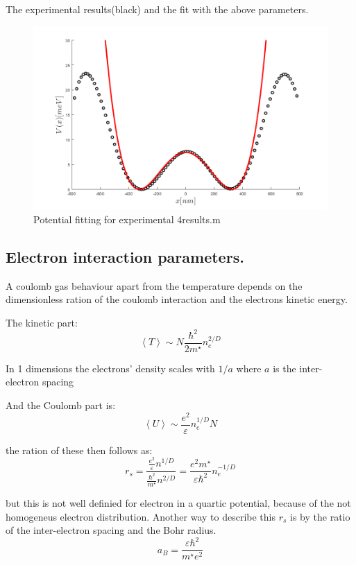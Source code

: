 \documentclass[12pt,a4paper]{article}
\numberwithin{equation}{section}
\begin{document}
The experimental results(black) and the fit with the above parameters.
\begin{figure}[!h]
\centering
\includegraphics[width=1\textwidth]{final}
\caption{Potential fitting for experimental 4results.m}
\end{figure}



\subsection{Electron interaction parameters.}

A coulomb gas behaviour apart from the temperature depends on the dimensionless ration of the coulomb interaction and the electrons kinetic energy. 

The kinetic part:
\begin{equation}
\left\langle T  \right\rangle \sim N \frac{\hbar^2}{2m^\star} n_e^{2/D}
\end{equation}

In 1 dimensions the electrons' density scales with $1/a$ where $a$ is the inter-electron spacing


And the Coulomb part is:
\begin{equation}
\left\langle U  \right\rangle \sim \frac{e^2}{\varepsilon} n_e^{1/D} N
\end{equation}

the ration of these then follows as:
\begin{equation}
r_s = \frac{\frac{e^2}{\varepsilon}n^{1/D}}{\frac{\hbar^2}{m^\star}n^{2/D}} = \frac{e^2 m^\star}{\varepsilon \hbar^2} n_e^{-1/D}
\end{equation}

but this is not well definied for electron in a quartic potential, because of the not homogeneus electron distribution. Another way to describe this $r_s$ is by the ratio of the inter-electron spacing and the Bohr radius.
\begin{equation}
a_B = \frac{\varepsilon \hbar^2}{m^\star e^2}
\end{equation}
\end{document}
